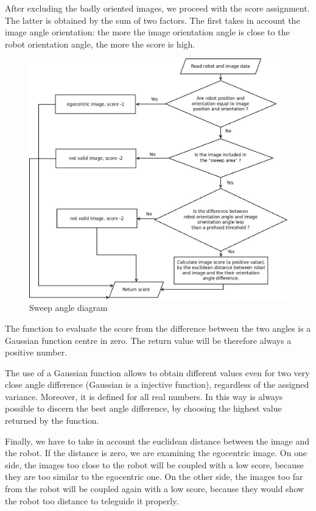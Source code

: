 %
After excluding the badly oriented images, we proceed with the score assignment. The latter is obtained by
the sum of two factors. The first takes in account the image angle orientation: the more the image orientation
angle is close to the robot orientation angle, the more the score is high.
%
\begin{figure}[!h]
  \begin{center}
    \includegraphics[width=400pt]{img/sweep_angle_diagram.jpeg} 
    \caption{Sweep angle diagram}
    \label{fig:sweep_angle_diagram}
  \end{center}
\end{figure}
%
The function to evaluate the score from the difference between the two angles is a Gaussian function centre
in zero. The return value will be therefore always a positive number.
%

%
The use of a Gaussian function allows to obtain different values even for two very close angle difference
(Gaussian is a injective function), regardless of the assigned variance. Moreover, it is defined for all real
numbers.
In this way is always possible to discern the best angle difference, by choosing the highest value returned by
the function.
%

%
Finally, we have to take in account the euclidean distance between the image and the robot. If the distance is
zero, we are examining the egocentric image. On one side, the images too close to the robot will be coupled
with a low score, because they are too similar to the egocentric one. On the other side, the images too far
from the robot will be coupled again with a low score, because they would show the robot too distance to
teleguide it properly.
%

